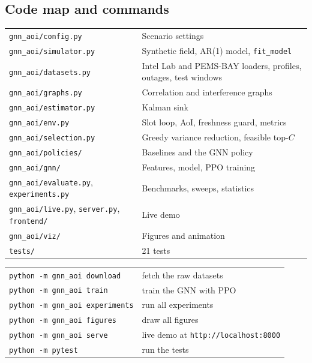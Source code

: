 \subsection{Code map and commands}
\begin{center}
\small
\begin{tabularx}{\textwidth}{@{}lX@{}}
\toprule
\texttt{gnn\_aoi/config.py} & Scenario settings \\
\texttt{gnn\_aoi/simulator.py} & Synthetic field, AR(1) model, \texttt{fit\_model} \\
\texttt{gnn\_aoi/datasets.py} & Intel Lab and PEMS-BAY loaders, profiles, outages, test windows \\
\texttt{gnn\_aoi/graphs.py} & Correlation and interference graphs \\
\texttt{gnn\_aoi/estimator.py} & Kalman sink \\
\texttt{gnn\_aoi/env.py} & Slot loop, AoI, freshness guard, metrics \\
\texttt{gnn\_aoi/selection.py} & Greedy variance reduction, feasible top-$C$ \\
\texttt{gnn\_aoi/policies/} & Baselines and the GNN policy \\
\texttt{gnn\_aoi/gnn/} & Features, model, PPO training \\
\texttt{gnn\_aoi/evaluate.py}, \texttt{experiments.py} & Benchmarks, sweeps, statistics \\
\texttt{gnn\_aoi/live.py}, \texttt{server.py}, \texttt{frontend/} & Live demo \\
\texttt{gnn\_aoi/viz/} & Figures and animation \\
\texttt{tests/} & 21 tests \\
\bottomrule
\end{tabularx}
\end{center}

\begin{center}
\small
\begin{tabular}{@{}ll@{}}
\toprule
\texttt{python -m gnn\_aoi download} & fetch the raw datasets \\
\texttt{python -m gnn\_aoi train} & train the GNN with PPO \\
\texttt{python -m gnn\_aoi experiments} & run all experiments \\
\texttt{python -m gnn\_aoi figures} & draw all figures \\
\texttt{python -m gnn\_aoi serve} & live demo at \texttt{http://localhost:8000} \\
\texttt{python -m pytest} & run the tests \\
\bottomrule
\end{tabular}
\end{center}
